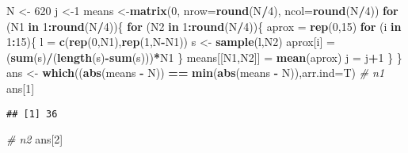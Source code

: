 \documentclass[]{article}
\newenvironment{Shaded}{\begin{snugshade}}{\end{snugshade}}
\newcommand{\CommentTok}[1]{\textcolor[rgb]{0.56,0.35,0.01}{\textit{#1}}}
\newcommand{\ControlFlowTok}[1]{\textcolor[rgb]{0.13,0.29,0.53}{\textbf{#1}}}
\newcommand{\DataTypeTok}[1]{\textcolor[rgb]{0.13,0.29,0.53}{#1}}
\newcommand{\DecValTok}[1]{\textcolor[rgb]{0.00,0.00,0.81}{#1}}
\newcommand{\KeywordTok}[1]{\textcolor[rgb]{0.13,0.29,0.53}{\textbf{#1}}}
\newcommand{\NormalTok}[1]{#1}
\newcommand{\OperatorTok}[1]{\textcolor[rgb]{0.81,0.36,0.00}{\textbf{#1}}}
\newcommand{\StringTok}[1]{\textcolor[rgb]{0.31,0.60,0.02}{#1}}
\begin{document}
\begin{Shaded}
\begin{Highlighting}[]
\NormalTok{N <-}\StringTok{ }\DecValTok{620}
\NormalTok{j <-}\DecValTok{1}
\NormalTok{means <-}\KeywordTok{matrix}\NormalTok{(}\DecValTok{0}\NormalTok{, }\DataTypeTok{nrow=}\KeywordTok{round}\NormalTok{(N}\OperatorTok{/}\DecValTok{4}\NormalTok{), }\DataTypeTok{ncol=}\KeywordTok{round}\NormalTok{(N}\OperatorTok{/}\DecValTok{4}\NormalTok{))}
\ControlFlowTok{for}\NormalTok{ (N1 }\ControlFlowTok{in} \DecValTok{1}\OperatorTok{:}\KeywordTok{round}\NormalTok{(N}\OperatorTok{/}\DecValTok{4}\NormalTok{))\{}
  \ControlFlowTok{for}\NormalTok{ (N2 }\ControlFlowTok{in} \DecValTok{1}\OperatorTok{:}\KeywordTok{round}\NormalTok{(N}\OperatorTok{/}\DecValTok{4}\NormalTok{))\{}
\NormalTok{    aprox =}\StringTok{ }\KeywordTok{rep}\NormalTok{(}\DecValTok{0}\NormalTok{,}\DecValTok{15}\NormalTok{)}
    \ControlFlowTok{for}\NormalTok{ (i }\ControlFlowTok{in} \DecValTok{1}\OperatorTok{:}\DecValTok{15}\NormalTok{)\{}
\NormalTok{       l =}\StringTok{ }\KeywordTok{c}\NormalTok{(}\KeywordTok{rep}\NormalTok{(}\DecValTok{0}\NormalTok{,N1),}\KeywordTok{rep}\NormalTok{(}\DecValTok{1}\NormalTok{,N}\OperatorTok{-}\NormalTok{N1))}
\NormalTok{       s <-}\StringTok{ }\KeywordTok{sample}\NormalTok{(l,N2)}
\NormalTok{       aprox[i] =}\StringTok{ }\NormalTok{(}\KeywordTok{sum}\NormalTok{(s)}\OperatorTok{/}\NormalTok{(}\KeywordTok{length}\NormalTok{(s)}\OperatorTok{-}\KeywordTok{sum}\NormalTok{(s)))}\OperatorTok{*}\NormalTok{N1}
\NormalTok{    \}}
\NormalTok{    means[[N1,N2]] =}\StringTok{ }\KeywordTok{mean}\NormalTok{(aprox)}
\NormalTok{    j =}\StringTok{ }\NormalTok{j}\OperatorTok{+}\DecValTok{1}
\NormalTok{  \}}
\NormalTok{\}}
\NormalTok{ans <-}\StringTok{ }\KeywordTok{which}\NormalTok{((}\KeywordTok{abs}\NormalTok{(means }\OperatorTok{-}\StringTok{ }\NormalTok{N)) }\OperatorTok{==}\StringTok{ }\KeywordTok{min}\NormalTok{(}\KeywordTok{abs}\NormalTok{(means }\OperatorTok{-}\StringTok{ }\NormalTok{N)),}\DataTypeTok{arr.ind=}\NormalTok{T)}
\CommentTok{# n1}
\NormalTok{ans[}\DecValTok{1}\NormalTok{]}
\end{Highlighting}
\end{Shaded}

\begin{verbatim}
## [1] 36
\end{verbatim}

\begin{Shaded}
\begin{Highlighting}[]
\CommentTok{# n2}
\NormalTok{ans[}\DecValTok{2}\NormalTok{]}
\end{Highlighting}
\end{Shaded}
\end{document}
